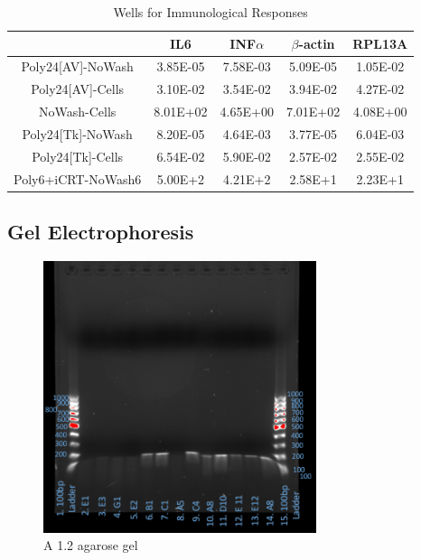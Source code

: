 \documentclass[journal, a4paper]{IEEEtran}
\begin{document}
    \begin{table}[!hbt]
      \begin{center}
      \caption{Wells for Immunological Responses}
      \label{tab:simParameters}
      \begin{tabular}{|c|c|c|c|c|}
        \hline
        & IL6 & INF$\alpha$ & $\beta$-actin & RPL13A \\
        \hline
        Poly24[AV]-NoWash & 3.85E-05 & 7.58E-03 & 5.09E-05 & 1.05E-02 \\
        \hline
        Poly24[AV]-Cells & 3.10E-02 & 3.54E-02 & 3.94E-02 & 4.27E-02 \\
        \hline
        NoWash-Cells & 8.01E+02 & 4.65E+00 & 7.01E+02 & 4.08E+00 \\
        \hline
        Poly24[Tk]-NoWash & 8.20E-05 & 4.64E-03 & 3.77E-05 & 6.04E-03\\
        \hline
        Poly24[Tk]-Cells & 6.54E-02 & 5.90E-02 & 2.57E-02 & 2.55E-02\\
        \hline
        Poly6+iCRT-NoWash6 & 5.00E+2 & 4.21E+2 & 2.58E+1 & 2.23E+1 \\
        \hline
      \end{tabular}
      \end{center}
    \end{table}

  \subsection{Gel Electrophoresis}

    \begin{figure}[t]
      \centering
      \includegraphics[width=8cm]{supergel}
      \caption{A 1.2 agarose gel}
      \label{fig:mesh1}
    \end{figure}
\end{document}
